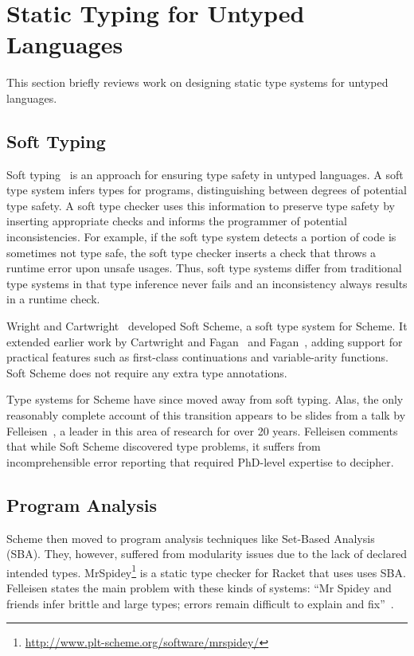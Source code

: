 \section{Static Typing for Untyped Languages}

This section briefly reviews work on designing static type systems for untyped languages.

\subsection{Soft Typing}

Soft typing~\cite{CF91}
is an approach for ensuring type safety in untyped languages.
A soft type system infers types for programs, distinguishing between degrees
of potential type safety.
A soft type checker uses this information to 
preserve type safety by inserting appropriate checks 
and informs the programmer of potential inconsistencies.
For example, if the soft type system detects a portion of code is sometimes not type safe,
the soft type checker inserts a check that throws a runtime error upon unsafe usages.
Thus, soft type systems differ from traditional type systems in that type inference 
never fails and an inconsistency always results in a runtime check.

Wright and Cartwright~\cite{WC97} developed Soft Scheme, a
soft type system for Scheme. 
It extended earlier work by Cartwright and Fagan~\cite{CF91}
and Fagan~\cite{Fag91}, adding support for practical features such as
first-class continuations and variable-arity functions.
Soft Scheme does not require any extra type annotations.

Type systems for Scheme have since moved away from soft typing.
Alas, the only reasonably complete account of this transition 
appears to be slides from a talk by Felleisen~\cite{Fell09},
a leader in this area of research for over 20 years.
Felleisen comments that while Soft Scheme discovered type problems, 
it suffers from incomprehensible
error reporting that required PhD-level expertise to decipher. 

\subsection{Program Analysis}

Scheme then moved to program analysis techniques like Set-Based Analysis~\cite{FF97} (SBA).
They, however, suffered from modularity issues due to the lack of declared intended types.
MrSpidey\footnote{\url{http://www.plt-scheme.org/software/mrspidey/}}
is a static type checker for Racket that uses uses SBA.
Felleisen states the main problem with these kinds of systems: ``Mr Spidey and friends infer brittle and large
types; errors remain difficult to explain and fix''~\cite{Fell09}.

